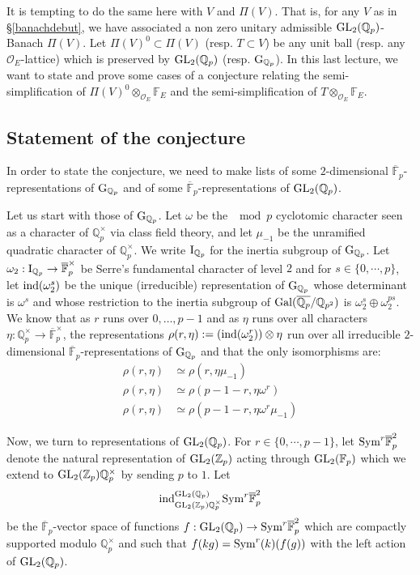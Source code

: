 \documentclass[11pt]{amsart}
\def\Z{{\mathbb Z}_p}
\def\Q{{\mathbb Q}_p}
\def\F{{\mathbb F}_p}
\def\g{{\rm G}_{\Q}}
\def\i{{\rm I}_{\Q}}
\def\G{{\rm GL}_2(\Q)}
\def\K{{\rm GL}_2(\Z)}
\def\O{{\mathcal O}_E}
\def\ra{\rightarrow}
\begin{document}
It is tempting to do the same here with $V$ and $\Pi(V)$. That is, for
any $V$ as in \S\ref{banachdebut}, we have associated a non zero
unitary admissible $\G$-Banach $\Pi(V)$. Let $\Pi(V)^0\subset \Pi(V)$
(resp. $T\subset V$) be any unit ball (resp. any $\O$-lattice) which
is preserved by $\G$ (resp. $\g$). In this last lecture, we want to
state and prove some cases of a conjecture relating the
semi-simplification of $\Pi(V)^0\otimes_{\O}{\mathbb F}_E$ and the
semi-simplification of $T\otimes_{\O}{\mathbb F}_E$.   
 
\subsection{Statement of the conjecture} 
In order to state the conjecture, we need to make  
lists of some $2$-dimensional $\overline\F$-representations  
of $\g$ and of some $\overline\F$-representations of $\G$.  
 
Let us start with those of $\g$. Let $\omega$ be the $\mod{p}$  
cyclotomic character seen as a character of $\Q^{\times}$ via class field theory, 
and let $\mu_{-1}$ be the unramified quadratic character of $\Q^{\times}$. 
We write $\i$ for the inertia subgroup of $\g$. Let $\omega_2  
: \i \ra \overline\F^{\times}$ be Serre's fundamental character of level $2$  
and for $s \in \{ 0,\cdots,p\}$, let ${\rm ind}(\omega_2^s)$  
be the unique (irreducible) representation of $\g$ whose determinant  
is $\omega^s$ and whose restriction to the inertia subgroup of  
${\rm Gal}(\overline{\Q}/\mathbb{Q}_{p^2})$ is $\omega_2^s \oplus \omega_2^{ps}$. 
We know that as $r$ runs over $0,\dots,p-1$ and as $\eta$ runs over all  
characters $\eta: \Q^{\times} \ra \overline\F^{\times}$, the representations 
$\rho(r,\eta):= ({\rm ind}(\omega_2^r)) \otimes \eta$ run over all  
irreducible $2$-dimensional $\overline\F$-representations of $\g$  
and that the only isomorphisms are: 
\begin{align*} 
\rho(r,\eta) & \simeq \rho(r,\eta \mu_{-1}) \\ 
\rho(r,\eta) & \simeq \rho(p-1-r,\eta \omega^r) \\ 
\rho(r,\eta) & \simeq \rho(p-1-r,\eta \omega^r \mu_{-1}) 
\end{align*} 
 
Now, we turn to representations of $\G$.  
For $r \in \{0,\cdots,p-1\}$, let  
${\rm Sym}^r \overline\F^2$ denote the natural representation of $\K$ 
acting through ${\rm GL}_2(\F)$ which we extend to $\K \Q^{\times}$ by sending $p$ to $1$. 
Let \[ {\rm ind}_{\K \Q^{\times}}^{\G}  
{\rm Sym}^r \overline\F^2 \] be the $\overline\F$-vector space of functions $f:\G 
\ra {\rm Sym}^r \overline\F^2$ which are compactly supported modulo $\Q^{\times}$ 
and such that $f(kg)={\rm Sym}^r(k)(f(g))$ with 
the left action of $\G$.  
 
\end{document}
